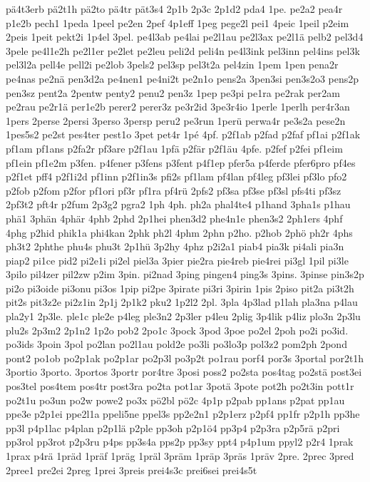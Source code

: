 {pä4t3erb
pä2t1h
pä2to
pä4tr
pät3s4
2p1b
2p3c
2p1d2
pda4
1pe.
pe2a2
pea4r
p1e2b
pech1
1peda
1peel
pe2en
2pef
4p1eff
1peg
pege2l
pei1
4peic
1peil
p2eim
2peis
1peit
pekt2i
1p4el
3pel.
pe4l3ab
pe4lai
pe2l1au
pe2l3ax
pe2l1ä
pelb2
pel3d4
3pele
pe4l1e2h
pe2l1er
pe2let
pe2leu
peli2d
peli4n
pe4l3ink
pel3inn
pel4ins
pel3k
pel3l2a
pell4e
pell2i
pe2lob
3pels2
pel3sp
pel3t2a
pel4zin
1pem
1pen
pena2r
pe4nas
pe2nä
pen3d2a
pe4nen1
pe4ni2t
pe2n1o
pens2a
3pen3si
pen3s2o3
pens2p
pen3sz
pent2a
2pentw
penty2
penu2
pen3z
1pep
pe3pi
pe1ra
pe2rak
per2am
pe2rau
pe2r1ä
per1e2b
perer2
perer3z
pe3r2id
3pe3r4io
1perle
1perlh
per4r3an
1pers
2perse
2persi
3perso
3persp
peru2
pe3run
1perü
perwa4r
pe3s2a
pese2n
1pes5s2
pe2st
pes4ter
pest1o
3pet
pet4r
1pé
4pf.
p2f1ab
p2fad
p2faf
pf1ai
p2f1ak
pf1am
pf1ans
p2fa2r
pf3are
p2f1au
1pfä
p2fär
p2f1äu
4pfe.
p2fef
p2fei
pf1eim
pf1ein
pf1e2m
p3fen.
p4fener
p3fens
p3fent
p4f1ep
pfer5a
p4ferde
pfer6pro
pf4es
p2f1et
pff4
p2f1i2d
pf1inn
p2f1in3s
pfi2s
pf1lam
pf4lan
pf4leg
pf3lei
pf3lo
pfo2
p2fob
p2fom
p2for
pf1ori
pf3r
pf1ra
pf4rü
2pfs2
pf3sa
pf3se
pf3sl
pfs4ti
pf3sz
2pf3t2
pft4r
p2fum
2p3g2
pgra2
1ph
4ph.
ph2a
phal4te4
p1hand
3pha1s
p1hau
phä1
3phän
4phär
4phb
2phd
2p1hei
phen3d2
phe4n1e
phen3s2
2ph1ers
4phf
4phg
p2hid
phik1a
phi4kan
2phk
ph2l
4phm
2phn
p2ho.
p2hob
2phö
ph2r
4phs
ph3t2
2phthe
phu4s
phu3t
2p1hü
3p2hy
4phz
p2i2a1
piab4
pia3k
pi4ali
pia3n
piap2
pi1ce
pid2
pi2e1i
pi2el
piel3a
3pier
pie2ra
pie4reb
pie4rei
pi3gl
1pil
pi3le
3pilo
pil4zer
pil2zw
p2im
3pin.
pi2nad
3ping
pingen4
ping3s
3pins.
3pinse
pin3s2p
pi2o
pi3oide
pi3onu
pi3os
1pip
pi2pe
3pirate
pi3ri
3pirin
1pis
2piso
pit2a
pi3t2h
pit2s
pit3z2e
pi2z1in
2p1j
2p1k2
pku2
1p2l2
2pl.
3pla
4p3lad
p1lah
pla3na
p4lau
pla2y1
2p3le.
ple1c
ple2e
p4leg
ple3n2
2p3ler
p4leu
2plig
3p4lik
p4liz
plo3n
2p3lu
plu2s
2p3m2
2p1n2
1p2o
pob2
2po1c
3pock
3pod
3poe
po2el
2poh
po2i
po3id.
po3ids
3poin
3pol
po2lan
po2l1au
pold2e
po3li
po3lo3p
pol3z2
pom2ph
2pond
pont2
po1ob
po2p1ak
po2p1ar
po2p3l
po3p2t
po1rau
porf4
por3s
3portal
por2t1h
3portio
3porto.
3portos
3portr
por4tre
3posi
poss2
po2sta
pos4tag
po2stä
post3ei
pos3tel
pos4tem
pos4tr
post3ra
po2ta
pot1ar
3potä
3pote
pot2h
po2t3in
pott1r
po2t1u
po3un
po2w
powe2
po3x
pö2bl
pö2c
4p1p
p2pab
pp1ans
p2pat
pp1au
ppe3e
p2p1ei
ppe2l1a
ppeli5ne
ppel3s
pp2e2n1
p2p1erz
p2pf4
pp1fr
p2p1h
pp3he
pp3l
p4p1lac
p4plan
p2p1lä
p2ple
pp3oh
p2p1ö4
pp3p4
p2p3ra
p2p5rä
p2pri
pp3rol
pp3rot
p2p3ru
p4ps
pp3s4a
pps2p
pp3sy
ppt4
p4p1um
ppyl2
p2r4
1prak
1prax
p4rä
1präd
1präf
1präg
1präl
3präm
1präp
3präs
1präv
2pre.
2prec
3pred
2pree1
pre2ei
2preg
1prei
3preis
prei4s3c
prei6sei
prei4s5t
}
